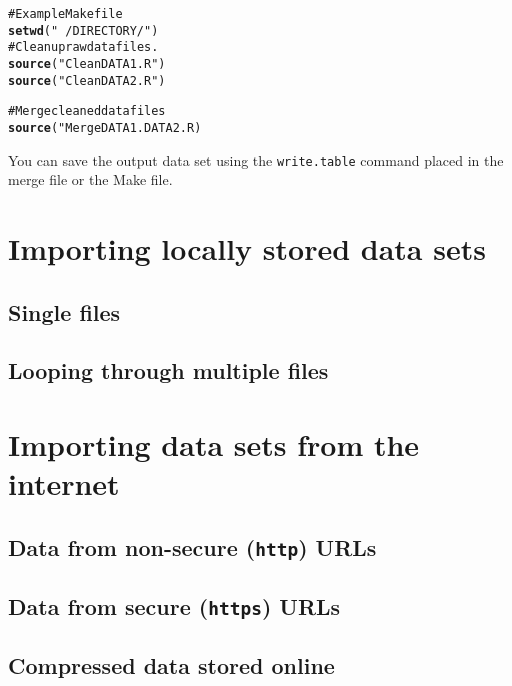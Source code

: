 \documentclass[ChapterTOCs,krantz1]{krantz}\usepackage{graphicx, color}
\makeatletter
\newcommand{\hlfunctioncall}[1]{\textcolor[rgb]{0.501960784313725,0,0.329411764705882}{\textbf{#1}}}%
\newcommand{\hlstring}[1]{\textcolor[rgb]{0.6,0.6,1}{#1}}%
\newcommand{\hlcomment}[1]{\textcolor[rgb]{0.180392156862745,0.6,0.341176470588235}{#1}}%
\newenvironment{kframe}{%
 \def\at@end@of@kframe{}%
 \ifinner\ifhmode%
  \def\at@end@of@kframe{\end{minipage}}%
  \begin{minipage}{\columnwidth}%
 \fi\fi%
 \def\FrameCommand##1{\hskip\@totalleftmargin \hskip-\fboxsep
 \colorbox{shadecolor}{##1}\hskip-\fboxsep
     \hskip-\linewidth \hskip-\@totalleftmargin \hskip\columnwidth}%
 \MakeFramed {\advance\hsize-\width
   \@totalleftmargin\z@ \linewidth\hsize
   \@setminipage}}%
 {\par\unskip\endMakeFramed%
 \at@end@of@kframe}
\newenvironment{knitrout}{}{} %
\makeatother
\begin{document}
\begin{knitrout}
\color{fgcolor}\begin{kframe}
\begin{alltt}
\hlcomment{# Example Make file}
\hlfunctioncall{setwd}(\hlstring{"~/DIRECTORY/"})
\hlcomment{# Clean up raw data files.}
\hlfunctioncall{source}(\hlstring{"CleanDATA1.R"})
\hlfunctioncall{source}(\hlstring{"CleanDATA2.R"})
    
\hlcomment{# Merge cleaned data files}
\hlfunctioncall{source}("MergeDATA1.DATA2.R)
\end{alltt}
\end{kframe}
\end{knitrout}


You can save the output data set using the {\tt{write.table}} command placed in the merge file or the Make file.

\section{Importing locally stored data sets}

\subsection{Single files}

\subsection{Looping through multiple files}

\section{Importing data sets from the internet}

\subsection{Data from non-secure ({\tt{http}}) URLs}

\subsection{Data from secure ({\tt{https}}) URLs}

\subsection{Compressed data stored online}
\end{document}
